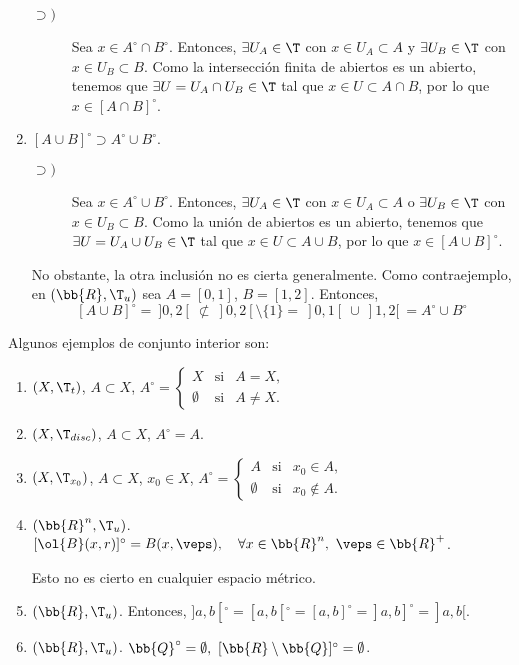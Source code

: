 \begin{enumerate}
\begin{description}
        \item[$\supset)$] Sea $x\in A^\circ \cap B^\circ$. Entonces, $\exists U_A\in \T$ con $x\in U_A\subset A$ y $\exists U_B\in \T$ con $x\in U_B\subset B$. Como la intersección finita de abiertos es un abierto, tenemos que $\exists U=U_A\cap U_B\in \T$ tal que $x\in U\subset A\cap B$, por lo que $x\in [A\cap B]^\circ$.
    \end{description}
    
    \item $[A\cup B]^\circ \supset A^\circ \cup B^\circ$.

    \begin{description}
        \item[$\supset)$] Sea $x\in A^\circ \cup B^\circ$. Entonces, $\exists U_A\in \T$ con $x\in U_A\subset A$ o $\exists U_B\in \T$ con $x\in U_B\subset B$. Como la unión de abiertos es un abierto, tenemos que $\exists U=U_A\cup U_B\in \T$ tal que $x\in U\subset A\cup B$, por lo que $x\in [A\cup B]^\circ$.
    \end{description}

    No obstante, la otra inclusión no es cierta generalmente. Como contraejemplo, en $(\bb{R},\T_u)$ sea $A=[0,1]$, $B=[1,2]$. Entonces,
    $$[A\cup B]^\circ = ~]0,2[~\not \subset~]0,2[\setminus \{1\} = ~]0,1[~\cup~ ]1,2[~=A^\circ \cup B^\circ$$
\end{enumerate}
\begin{ejemplo} Algunos ejemplos de conjunto interior son:
    \begin{enumerate}
        \item $(X,\T_t)$, $A\subset X$, $A^\circ = \left\{\begin{array}{ccc}
            X & \text{si} & A=X, \\
            \emptyset & \text{si} & A\neq X.
        \end{array}\right.$

        \item $(X,\T_{disc})$, $A\subset X$, $A^\circ = A$.

        \item $(X,\T_{x_0})$, $A\subset X$, $x_0\in X$, $A^\circ = \left\{\begin{array}{ccc}
            A & \text{si} & x_0\in A, \\
            \emptyset & \text{si} & x_0\notin A.
        \end{array}\right.$

        \item $(\bb{R}^n, \T_u)$. $[\ol{B}(x,r)]^\circ = B(x,\veps),\quad \forall x\in \bb{R}^n,~\veps\in \bb{R}^+$.

        Esto no es cierto en cualquier espacio métrico.

        \item $(\bb{R}, \T_u)$. Entonces, $]a,b[^\circ = [a,b[^\circ = [a,b]^\circ = ]a,b]^\circ = ]a,b[$.
        \item $(\bb{R}, \T_u)$. $\bb{Q}^\circ= \emptyset,~[\bb{R}\setminus\bb{Q}]^\circ = \emptyset$.
    \end{enumerate}
\end{ejemplo}


